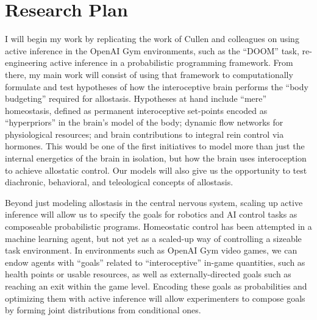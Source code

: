 
\section*{Research Plan}
\begin{singlespace}
\im
I will begin my work by replicating the work of Cullen and colleagues on
using active inference in the OpenAI Gym environments, such as the ``DOOM''
task\cite{Cullen2018}, re-engineering active inference in a probabilistic
programming framework.  From there, my main work will consist of using that
framework to computationally formulate and test hypotheses of how the
interoceptive brain performs the ``body budgeting'' required for allostasis.
Hypotheses at hand include ``mere'' homeostasis, defined as permanent
interoceptive set-points encoded as ``hyperpriors'' in the brain's model of
the body\cite{Morville2018a}; dynamic flow networks for physiological
resources; and brain contributions to integral rein control via hormones\cite{SAUNDERS1998}.  This would be one
of the first initiatives to model more than just the internal energetics of
the brain in isolation, but how the brain uses interoception to achieve
allostatic control\cite{Sterling2012,Sterling2015,Christie2015}.  Our models
will also give us the opportunity to test diachronic, behavioral, and
teleological concepts of allostasis\cite{Corcoran2017}.
\end{singlespace}

\begin{singlespace}
\im
Beyond just modeling allostasis in the central nervous system, scaling
up active inference will allow us to specify the goals for robotics and AI
control tasks as composeable probabilistic programs.  Homeostatic control has
been attempted in a machine learning agent, but not yet as a scaled-up way
of controlling a sizeable task environment\cite{Penny}.  In environments such
as OpenAI Gym video games, we can endow agents with ``goals'' related to
``interoceptive'' in-game quantities, such as health points or usable
resources, as well as externally-directed goals such as reaching an exit
within the game level.  Encoding these goals as probabilities and optimizing
them with active inference will allow experimenters to compose goals by
forming joint distributions from conditional ones.
\end{singlespace}

